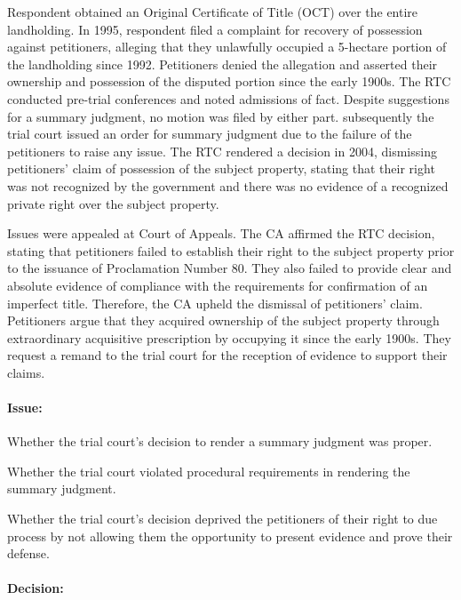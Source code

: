 \documentclass[
12pt,
oneside,
onehalfspacing,
headsepline
]{DigestCollection}
\begin{document}
Respondent obtained an Original Certificate of Title (OCT) over the entire landholding. In 1995, respondent filed a complaint for recovery of possession against petitioners, alleging that they unlawfully occupied a 5-hectare portion of the landholding since 1992. Petitioners denied the allegation and asserted their ownership and possession of the disputed portion since the early 1900s. The RTC conducted pre-trial conferences and noted admissions of fact. Despite suggestions for a summary judgment, no motion was filed by either part. subsequently the trial court issued an order for summary judgment due to the failure of the petitioners to raise any issue. The RTC rendered a decision in 2004, dismissing petitioners' claim of possession of the subject property, stating that their right was not recognized by the government and there was no evidence of a recognized private right over the subject property.

Issues were appealed at Court of Appeals. The CA affirmed the RTC decision, stating that petitioners failed to establish their right to the subject property prior to the issuance of Proclamation Number 80. They also failed to provide clear and absolute evidence of compliance with the requirements for confirmation of an imperfect title. Therefore, the CA upheld the dismissal of petitioners' claim. Petitioners argue that they acquired ownership of the subject property through extraordinary acquisitive prescription by occupying it since the early 1900s. They request a remand to the trial court for the reception of evidence to support their claims.

\paragraph{Issue:}
\label{fc1f2180-1235-11ef-aa24-9916ea601717}


Whether the trial court's decision to render a summary judgment was proper.

Whether the trial court violated procedural requirements in rendering the summary judgment.

Whether the trial court's decision deprived the petitioners of their right to due process by not allowing them the opportunity to present evidence and prove their defense.

\paragraph{Decision:}
\label{fe948e50-1235-11ef-aa24-9916ea601717}
\end{document}
